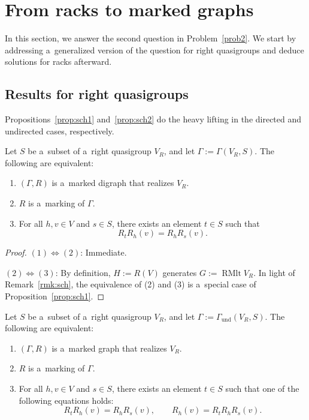 \documentclass{jonasart}
\DeclareMathOperator{\RMlt}{RMlt}
\newcommand{\und}{\mathrm{und}}
\begin{document}
	\section{From racks to marked graphs}\label{sec:4}

	In this section, we answer the second question in Problem~\ref{prob2}. We start by addressing a~generalized version of the question for right quasigroups and deduce solutions for racks afterward.

	\subsection{Results for right quasigroups}
    
	Propositions~\ref{prop:sch1} and~\ref{prop:sch2} do the heavy lifting in the directed and undirected cases, respectively.
    
	\begin{theorem}\label{thm:marked1}
		Let $S$ be a~subset of a~right quasigroup $V_R$, and let $\Gamma:=\Gamma(V_R,S)$. The following are equivalent:
		\begin{enumerate}
			\item $(\Gamma,R)$ is a~marked digraph that realizes $V_R$.
			\item $R$ is a~marking of $\Gamma$.
			\item For all $h,v\in V$ and $s\in S$, there exists an element $t\in S$ such that
			\[
				R_t R_h (v)=R_h R_s (v).
			\]
		\end{enumerate}
	\end{theorem}

	\begin{proof}
		$(1)\iff(2)$: Immediate.

		$(2)\iff(3)$: By definition, $H:=R(V)$ generates $G:=\RMlt V_R$. In light of Remark~\ref{rmk:sch}, the equivalence of (2) and (3) is a~special case of Proposition~\ref{prop:sch1}.
	\end{proof}

	\begin{theorem}\label{thm:marked2}
		Let $S$ be a~subset of a~right quasigroup $V_R$, and let $\Gamma:=\Gamma_{\und}(V_R,S)$. The following are equivalent:
		\begin{enumerate}
			\item $(\Gamma,R)$ is a~marked graph that realizes $V_R$.
			\item $R$ is a~marking of $\Gamma$.
			\item For all $h,v\in V$ and $s\in S$, there exists an element $t\in S$ such that one of the following equations holds:
			\[
				R_tR_h(v)=R_hR_s(v),\quad\quad R_h(v)=R_tR_hR_s(v).
			\]
		\end{enumerate}
	\end{theorem}
\end{document}
